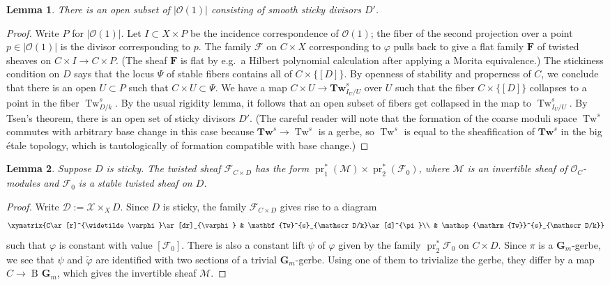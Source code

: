 \documentclass[11pt]{amsart}
\newcommand{\field}[1]{\mathbf #1}
\newcommand{\ms}[1]{\mathscr #1}
\newcommand{\F}{\field F}
\renewcommand{\phi}{\varphi}
\DeclareMathOperator{\pr}{pr}
\newcommand{\G}{\field G} %
\renewcommand{\[}{[\!\hspace{0.03em}[}
\renewcommand{\]}{]\!\hspace{0.03em}]}
\renewcommand{\(}{(\!\hspace{0.03em}(}
\renewcommand{\)}{)\!\hspace{0.03em})}
\newcommand{\Tw}{\mathbf{Tw}}
\DeclareMathOperator{\mTw}{Tw}
\DeclareMathOperator{\B}{\operatorname{B\!}}
\newtheorem{lem}{Lemma}[subsubsection]%
\theoremstyle{definition}
\theoremstyle{remark}
\begin{document}
\begin{lem}\label{L:open set of yummies} There is an open subset of $|{\ms O}(1)|$ consisting of smooth sticky
divisors $D'$.
\end{lem}
\begin{proof} Write $P$ for $|{\ms O}(1)|$.  Let $I\subset X\times P$ be 
the incidence correspondence of ${\ms O}(1)$; the fiber of the second 
projection over a point $p\in|{\ms O}(1)|$ is the divisor corresponding to 
$p$.  The family $\ms F$ on $C\times X$ corresponding to $\phi$ pulls back to give a flat family 
$\F$ of twisted sheaves on $C\times I\to C\times P$.  (The 
sheaf $\F$ is flat by e.g.\ a Hilbert polynomial calculation after 
applying a Morita equivalence.)  The stickiness condition on $D$ says that the locus $\Psi$ of stable 
fibers contains all of $C\times\{[D]\}$.  By openness of stability and 
properness of $C$, we conclude that there is an open $U\subset P$ such 
that $C\times U\subset\Psi$.  We have a map $C\times 
U\to\Tw^{s}_{I_{U}/U}$ over $U$ such that the fiber $C\times\{[D]\}$ 
collapses to a point in the fiber $\mTw^{s}_{D/k}$.  By the usual 
rigidity lemma, it follows that an open subset of fibers get 
collapsed in the map to $\mTw^{s}_{I_{U}/U}$.  By Tsen's theorem, 
there is an open set of sticky divisors $D'$.  (The 
careful reader will note that the formation of the coarse moduli 
space $\mTw^{s}$ commutes with arbitrary base change in this case 
because $\Tw^{s}\to\mTw^{s}$ is a gerbe, so $\mTw^{s}$ is equal to the 
sheafification of $\Tw^{s}$ in the big \'etale topology, which is 
tautologically of formation compatible with 
base change.)
\end{proof}

\begin{lem}\label{L:structure of one yummy} Suppose $D$ is sticky.  The twisted sheaf $\ms 
F_{C\times D}$ has the form $\pr_{1}^{\ast}(\ms 
M)\times\pr_{2}^{\ast}(\ms F_{0})$, where $\ms M$ is an invertible 
sheaf of ${\ms O}_{C}$-modules and $\ms F_{0}$ is a stable twisted sheaf on $D$.
\end{lem}
\begin{proof}  Write $\ms D:=\ms X\times_{X}D$.  Since $D$ is sticky, the family $\ms F_{C\times D}$ gives rise to a diagram
    $$\xymatrix{C\ar[r]^{\widetilde\phi}\ar[dr]_{\phi} & \Tw^{s}_{\ms 
    D/k}\ar[d]^{\pi}\\
    & \mTw^{s}_{\ms D/k}}$$
such that $\phi$ is constant with value $[\ms F_{0}]$.  There is 
also a constant lift $\psi$ of $\phi$ given by the family 
$\pr_{2}^{\ast}\ms F_{0}$ on $C\times D$.  Since $\pi$ is a 
$\G_{m}$-gerbe, we see that $\psi$ and $\widetilde\phi$ are 
identified with two sections of a trivial $\G_{m}$-gerbe.  Using one 
of them to trivialize the gerbe, they differ by a map 
$C\to\B{\G_{m}}$, which gives the invertible sheaf $\ms M$.
\end{proof}
\end{document}
